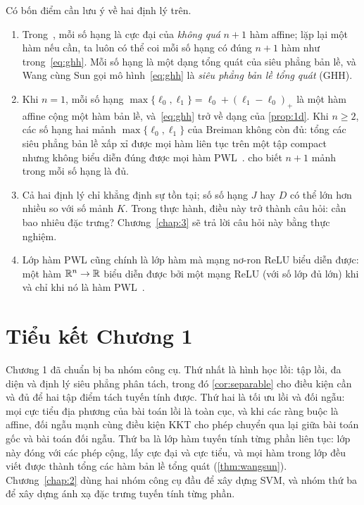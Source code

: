 \begin{remark}\label{rem:ghh}
Có bốn điểm cần lưu ý về hai định lý trên.
\begin{enumerate}[label=(\roman*),leftmargin=2em]
\item Trong~\cite{wang2005}, mỗi số hạng là cực đại của \emph{không quá} $n+1$ hàm affine; lặp lại một hàm nếu cần, ta luôn có thể coi mỗi số hạng có đúng $n+1$ hàm như trong~\eqref{eq:ghh}. Mỗi số hạng là một dạng tổng quát của siêu phẳng bản lề, và Wang cùng Sun gọi mô hình~\eqref{eq:ghh} là \emph{siêu phẳng bản lề tổng quát} (GHH).
\item Khi $n=1$, mỗi số hạng $\max\{\ell_0,\ell_1\}=\ell_0+(\ell_1-\ell_0)_+$ là một hàm affine cộng một hàm bản lề, và~\eqref{eq:ghh} trở về dạng của \cref{prop:1d}. Khi $n\ge 2$, các số hạng hai mảnh $\max\{\ell_0,\ell_1\}$ của Breiman không còn đủ: tổng các siêu phẳng bản lề xấp xỉ được mọi hàm liên tục trên một tập compact~\cite{breiman1993} nhưng không biểu diễn đúng được mọi hàm PWL~\cite{wang2005}.  cho biết $n+1$ mảnh trong mỗi số hạng là đủ.
\item Cả hai định lý chỉ khẳng định sự tồn tại; số số hạng $J$ hay $D$ có thể lớn hơn nhiều so với số mảnh $K$. Trong thực hành, điều này trở thành câu hỏi: cần bao nhiêu đặc trưng? Chương~\ref{chap:3} sẽ trả lời câu hỏi này bằng thực nghiệm.
\item Lớp hàm PWL cũng chính là lớp hàm mà mạng nơ-ron ReLU biểu diễn được: một hàm $\mathbb{R}^n\to\mathbb{R}$ biểu diễn được bởi một mạng ReLU (với số lớp đủ lớn) khi và chỉ khi nó là hàm PWL~\cite{arora2018}.
\end{enumerate}
\end{remark}

\section*{Tiểu kết Chương 1}

Chương 1 đã chuẩn bị ba nhóm công cụ. Thứ nhất là hình học lồi: tập lồi, đa diện và định lý siêu phẳng phân tách, trong đó \cref{cor:separable} cho điều kiện cần và đủ để hai tập điểm tách tuyến tính được. Thứ hai là tối ưu lồi và đối ngẫu: mọi cực tiểu địa phương của bài toán lồi là toàn cục, và khi các ràng buộc là affine, đối ngẫu mạnh cùng điều kiện KKT cho phép chuyển qua lại giữa bài toán gốc và bài toán đối ngẫu. Thứ ba là lớp hàm tuyến tính từng phần liên tục: lớp này đóng với các phép cộng, lấy cực đại và cực tiểu, và mọi hàm trong lớp đều viết được thành tổng các hàm bản lề tổng quát (\cref{thm:wangsun}). Chương~\ref{chap:2} dùng hai nhóm công cụ đầu để xây dựng SVM, và nhóm thứ ba để xây dựng ánh xạ đặc trưng tuyến tính từng phần.
